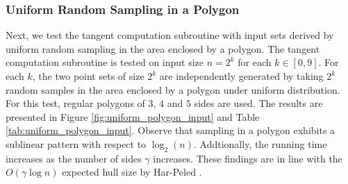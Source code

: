 \documentclass{article}
\newcommand{\figref}[1]{Figure \ref{#1}}
\newcommand{\tabref}[1]{Table \ref{#1}}
\begin{document}
\begin{figure}[h]
    \begin{floatrow}
    \end{floatrow}
\end{figure}

\subsubsection{Uniform Random Sampling in a Polygon}

Next, we test the tangent computation subroutine with input sets derived by uniform random sampling in the area enclosed by a polygon. The tangent computation subroutine is tested on input size $n = 2^k$ for each $k \in [0, 9]$. For each $k$, the two point sets of size $2^k$ are independently generated by taking $2^k$ random samples in the area enclosed by a polygon under uniform distribution. For this test, regular polygons of $3$, $4$ and $5$ sides are used. The results are presented in \figref{fig:uniform_polygon_input} and \tabref{tab:uniform_polygon_input}. Observe that sampling in a polygon exhibits a sublinear pattern with respect to $\log_2(n)$. Addtionally, the running time increases as the number of sides $\gamma$ increases. These findings are in line with the $O(\gamma \log n)$ expected hull size by Har-Peled \cite{hp11}.
\end{document}
